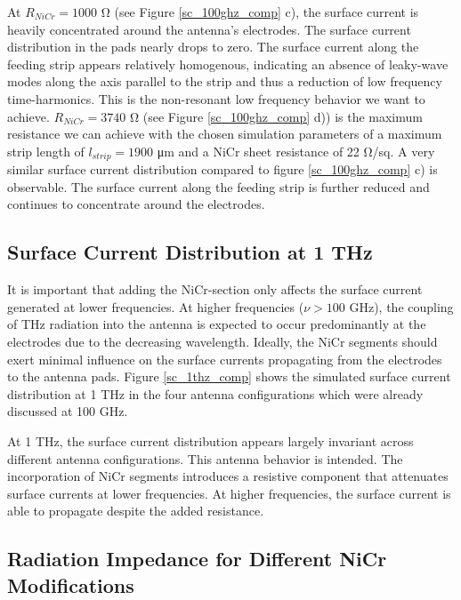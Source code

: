 At $R_{NiCr} = 1000$ \si{\ohm} (see Figure \ref{sc_100ghz_comp} c), the surface current is heavily concentrated around the antenna's electrodes. The surface current distribution in the pads nearly drops to zero. The surface current along the feeding strip appears relatively homogenous, indicating an absence of leaky-wave modes along the axis parallel to the strip and thus a reduction of low frequency time-harmonics. This is the non-resonant low frequency behavior we want to achieve. $R_{NiCr} = 3740$ \si{\ohm} (see Figure \ref{sc_100ghz_comp} d)) is the maximum resistance we can achieve with the chosen simulation parameters of a maximum strip length of $l_{strip} = 1900$ \si{\micro \meter} and a NiCr sheet resistance of \num{22} \si{\ohm/sq}. A very similar surface current distribution compared to figure \ref{sc_100ghz_comp} c) is observable. The surface current along the feeding strip is further reduced and continues to concentrate around the electrodes. 

\subsection{Surface Current Distribution at 1 THz}

It is important that adding the NiCr-section only affects the surface current generated at lower frequencies. At higher frequencies ($\nu > 100$ \si{\giga \hertz}), the coupling of THz radiation into the antenna is expected to occur predominantly at the electrodes due to the decreasing wavelength. Ideally, the NiCr segments should exert minimal influence on the surface currents propagating from the electrodes to the antenna pads. Figure \ref{sc_1thz_comp} shows the simulated surface current distribution at \num{1} \si{\tera \hertz} in the four antenna configurations which were already discussed at \num{100} \si{\giga \hertz}. 

At \num{1} \si{\tera \hertz}, the surface current distribution appears largely invariant across different antenna configurations. This antenna behavior is intended. The incorporation of NiCr segments introduces a resistive component that attenuates surface currents at lower frequencies. At higher frequencies, the surface current is able to propagate despite the added resistance. 

\subsection{Radiation Impedance for Different NiCr Modifications}

